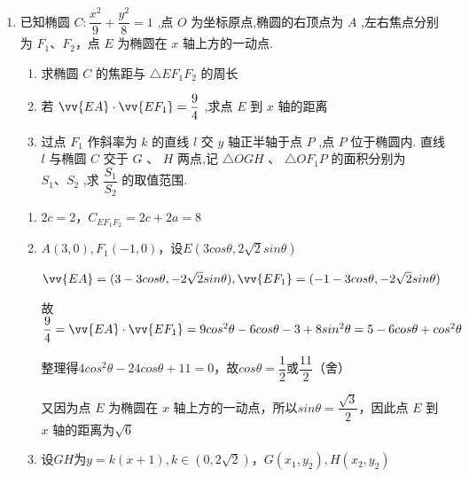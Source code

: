 \begin{enumerate}
\begin{enumerate}
\begin{jieda}
\begin{enumerate}
                易知当$A$为$(0, 1)$时，设$B(\sqrt{5}cos\theta, sin\theta)$，$AF_1: x - 2y + 2 = 0$，$|AF_1| = \sqrt{5}$

                $B$到$AF_1$距离$d = \dfrac{|\sqrt{5}cos\theta - 2sin\theta + 2|}{\sqrt{5}} \leq \sqrt{5}$
                
                当$d$取最大值时，$S = \dfrac{5}{2} > \sqrt{5}$，矛盾，故不存在满足要求的$A, B$.
            \end{enumerate}
        \end{jieda}

        \item 已知椭圆 $C : \dfrac{{x}^{2}}{9} + \dfrac{{y}^{2}}{8} = 1$ ,点 $O$ 为坐标原点,椭圆的右顶点为 $A$ ,左右焦点分别为 ${F}_{1}\text{、}{F}_{2}$，点 $E$ 为椭圆在 $x$ 轴上方的一动点.
        \begin{enumerate}
            \item 求椭圆 $C$ 的焦距与 $\bigtriangleup E{F}_{1}{F}_{2}$ 的周长
            \item 若 $\vv{EA} \cdot  \vv{E{F}_{1}} = \dfrac{9}{4}$ ,求点 $E$ 到 $x$ 轴的距离
            \item 过点 ${F}_{1}$ 作斜率为 $k$ 的直线 $l$ 交 $y$ 轴正半轴于点 $P$ ,点 $P$ 位于椭圆内. 直线 $l$ 与椭圆 $C$ 交于 $G$ 、 $H$ 两点,记 $\bigtriangleup  {OGH}$ 、 $\bigtriangleup  O{F}_{1}P$ 的面积分别为 ${S}_{1}\text{、}{S}_{2}$ ,求 $\dfrac{{S}_{1}}{{S}_{2}}$ 的取值范围.
        \end{enumerate}
        \begin{jieda}
            \begin{enumerate}
                \item $2c = 2$，$C_{EF_1F_2} = 2c+2a = 8$
                \item $A(3, 0), F_1(-1, 0)$，设$E(3cos\theta, 2\sqrt{2}sin\theta)$
                
                $\vv{EA} = (3-3cos\theta, -2\sqrt{2}sin\theta), \vv{EF_1} = (-1-3cos\theta, -2\sqrt{2}sin\theta)$
                
                故$\dfrac{9}{4} = \vv{EA} \cdot  \vv{E{F}_{1}} = 9cos^2\theta-6cos\theta-3+8sin^2\theta = 5 - 6cos\theta + cos^2\theta$
                
                整理得$4cos^2\theta - 24cos\theta + 11 = 0$，故$cos\theta = \dfrac{1}{2}$或$\dfrac{11}{2}$（舍）

                又因为点 $E$ 为椭圆在 $x$ 轴上方的一动点，所以$sin\theta = \dfrac{\sqrt{3}}{2}$，因此点 $E$ 到 $x$ 轴的距离为$\sqrt{6}$
                \item 设$GH$为$y = k(x+1), k \in (0, 2\sqrt{2})$，$G(x_1, y_2), H(x_2, y_2)$
                

\end{enumerate}
\end{jieda}
\end{enumerate}
\end{enumerate}

